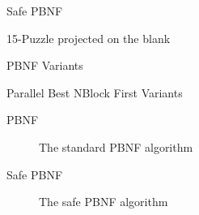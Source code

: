\documentclass[style=unh]{powerdot}
\begin{document}
\begin{slide}{Safe PBNF}
{\begin{center}
    \end{center}
  }
   {
    \vspace{-.3in}
    \begin{center}
      15-Puzzle projected on the blank
    \end{center}
  }

\end{slide}


\begin{slide}{PBNF Variants}
  \vspace{.2in}
  \begin{center}
    Parallel Best NBlock First Variants
  \end{center}
  \begin{description}
  \item[PBNF] The standard PBNF algorithm
  \item[Safe PBNF] The safe PBNF algorithm
  \end{description}
\end{slide}
\end{document}
